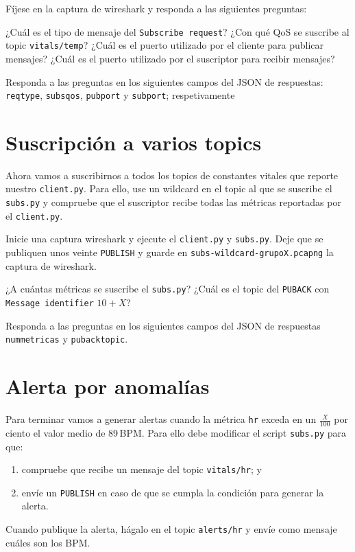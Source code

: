 \documentclass{upmassignment}
\begin{document}
Fíjese en la captura de wireshark y
responda a las siguientes preguntas:
\begin{problemlist}
    \pbitem ¿Cuál es el tipo de mensaje
        del \texttt{Subscribe request}?
    \pbitem ¿Con qué QoS se suscribe
        al topic \texttt{vitals/temp}?
    \pbitem ¿Cuál es el puerto
        utilizado por el
        cliente para publicar mensajes?
    \pbitem ¿Cuál es el puerto
        utilizado por el
        suscriptor para recibir mensajes?
\end{problemlist}
Responda a las preguntas en los
siguientes campos del JSON de respuestas:
\texttt{reqtype},
\texttt{subsqos},
\texttt{pubport} y
\texttt{subport}; respetivamente





\section*{Suscripción a varios topics}
Ahora vamos a suscribirnos a todos los
topics de constantes vitales que reporte
nuestro \texttt{client.py}. Para ello,
use un wildcard en el topic al que se
suscribe el \texttt{subs.py} y compruebe
que el suscriptor recibe todas las métricas
reportadas por el \texttt{client.py}.


Inicie una captura wireshark
y ejecute el \texttt{client.py} y
\texttt{subs.py}. Deje que se publiquen
unos veinte \texttt{PUBLISH} y guarde en
\texttt{subs-wildcard-grupoX.pcapng}
la captura de wireshark.
\begin{problemlist}
    \pbitem ¿A cuántas métricas se suscribe
        el \texttt{subs.py}?
    \pbitem ¿Cuál es el topic del
        \texttt{PUBACK} con
        \texttt{Message identifier} $10+X$?
\end{problemlist}
Responda a las preguntas en los
siguientes campos del JSON de respuestas
\texttt{nummetricas} y
\texttt{pubacktopic}.




\section*{Alerta por anomalías}
Para terminar vamos a generar alertas cuando
la métrica \texttt{hr} exceda en un
$\tfrac{X}{100}$ por ciento el valor medio
de 89\,\textrm{BPM}.
Para ello debe modificar el script
\texttt{subs.py} para que:
\begin{enumerate}
    \item compruebe que recibe un mensaje
        del topic \texttt{vitals/hr}; y
    \item envíe un \texttt{PUBLISH} en caso
        de que se cumpla la condición
        para generar la alerta.
\end{enumerate}
Cuando publique la alerta, hágalo en
el topic \texttt{alerts/hr} y envíe como
mensaje cuáles son los BPM.
\end{document}
